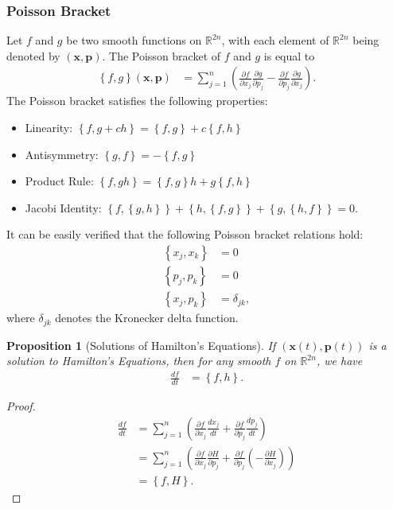 \documentclass[12pt]{extarticle}
\newcommand{\R}{\mathbb{R}}
\newcommand{\set}[1]{\left\{#1\right\}}
\theoremstyle{plain}
\newtheorem*{proposition}{Proposition}%
\theoremstyle{definition}
\theoremstyle{remark}
\begin{document}
  \subsubsection{Poisson Bracket}%
  Let $f$ and $g$ be two smooth functions on $\R^{2n}$, with each element of $\R^{2n}$ being denoted by $(\mathbf{x},\mathbf{p})$. The Poisson bracket of $f$ and $g$ is equal to
  \begin{align*}
    \set{f,g} (\mathbf{x},\mathbf{p}) &= \sum_{j=1}^{n}\left(\frac{\partial f}{\partial x_j}\frac{\partial g}{\partial p_j} - \frac{\partial f}{\partial p_j}\frac{\partial g}{\partial x_j}\right).
  \end{align*}
  The Poisson bracket satisfies the following properties:
  \begin{itemize}
    \item Linearity: $\set{f,g+ch} = \set{f,g} + c\set{f,h}$
    \item Antisymmetry: $\set{g,f} = -\set{f,g}$
    \item Product Rule: $\set{f,gh} = \set{f,g}h + g\set{f,h}$
    \item Jacobi Identity: $\set{f,\set{g,h}} + \set{h,\set{f,g}} + \set{g,\set{h,f}} = 0$.
  \end{itemize}
  It can be easily verified that the following Poisson bracket relations hold:
  \begin{align*}
    \set{x_j,x_k} &= 0\\
    \set{p_j,p_k} &= 0\\
    \set{x_j,p_k} &= \delta_{jk},
  \end{align*}
  where $\delta_{jk}$ denotes the Kronecker delta function.
  \begin{proposition}[Solutions of Hamilton's Equations]
    If $(\mathbf{x}(t),\mathbf{p}(t))$ is a solution to Hamilton's Equations, then for any smooth $f$ on $\R^{2n}$, we have
    \begin{align*}
      \frac{df}{dt} &= \set{f,h}.
    \end{align*}
  \end{proposition}
  \begin{proof}
    \begin{align*}
      \frac{df}{dt} &= \sum_{j=1}^{n}\left(\frac{\partial f}{\partial x_j}\frac{dx_j}{dt} + \frac{\partial f}{\partial p_j}\frac{dp_j}{dt}\right) \\
                    &= \sum_{j=1}^{n}\left(\frac{\partial f}{\partial x_j}\frac{\partial H}{\partial p_j}+ \frac{\partial f}{\partial p_j}\left(-\frac{\partial H}{\partial x_j}\right)\right)\\
                    &= \set{f,H}.
    \end{align*}
  \end{proof}
\end{document}
